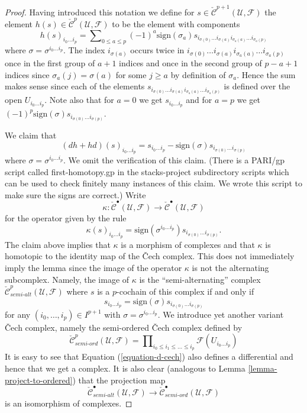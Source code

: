 \begin{proof}
\medskip\noindent
Having introduced this notation we define for
$s \in \check{\mathcal{C}}^{p + 1}(\mathcal{U}, \mathcal{F})$
the element $h(s) \in \check{\mathcal{C}}^p(\mathcal{U}, \mathcal{F})$
to be the element with components
\begin{equation}
\label{equation-first-homotopy}
h(s)_{i_0\ldots i_p} =
\sum\nolimits_{0 \leq a \leq p}
(-1)^a \text{sign}(\sigma_a)
s_{i_{\sigma(0)} \ldots i_{\sigma(a)} i_{\sigma_a(a)} \ldots i_{\sigma_a(p)}}
\end{equation}
where $\sigma = \sigma^{i_0 \ldots i_p}$. The index
$i_{\sigma(a)}$ occurs twice in
$i_{\sigma(0)} \ldots i_{\sigma(a)} i_{\sigma_a(a)} \ldots i_{\sigma_a(p)}$
once in the first group of $a + 1$ indices and once in the second group
of $p - a + 1$ indices since $\sigma_a(j) = \sigma(a)$ for some
$j \geq a$ by definition of $\sigma_a$. Hence the sum makes sense since each
of the elements
$s_{i_{\sigma(0)} \ldots i_{\sigma(a)} i_{\sigma_a(a)} \ldots i_{\sigma_a(p)}}$
is defined over the open $U_{i_0 \ldots i_p}$.
Note also that for $a = 0$ we get $s_{i_0 \ldots i_p}$ and
for $a = p$ we get
$(-1)^p \text{sign}(\sigma) s_{i_{\sigma(0)} \ldots i_{\sigma(p)}}$.

\medskip\noindent
We claim that
$$
(dh + hd)(s)_{i_0 \ldots i_p} =
s_{i_0 \ldots i_p} -
\text{sign}(\sigma) s_{i_{\sigma(0)} \ldots i_{\sigma(p)}}
$$
where $\sigma = \sigma^{i_0 \ldots i_p}$. We omit the verification
of this claim. (There is a PARI/gp script called first-homotopy.gp
in the stacks-project subdirectory scripts which can be used to check
finitely many instances of this claim.
We wrote this script to make sure the signs are correct.)
Write
$$
\kappa :
\check{\mathcal{C}}^\bullet(\mathcal{U}, \mathcal{F})
\longrightarrow
\check{\mathcal{C}}^\bullet(\mathcal{U}, \mathcal{F})
$$
for the operator given by the rule
$$
\kappa(s)_{i_0 \ldots i_p} =
\text{sign}(\sigma^{i_0 \ldots i_p}) s_{i_{\sigma(0)} \ldots i_{\sigma(p)}}.
$$
The claim above implies that $\kappa$ is a morphism of complexes and that
$\kappa$ is homotopic to the identity map of the {\v C}ech complex.
This does not immediately imply the lemma since
the image of the operator $\kappa$ is not the alternating subcomplex.
Namely, the image of $\kappa$ is the ``semi-alternating'' complex
$\check{\mathcal{C}}_{semi\text{-}alt}^p(\mathcal{U}, \mathcal{F})$
where $s$ is a $p$-cochain of this complex if and only if
$$
s_{i_0 \ldots i_p} = \text{sign}(\sigma) s_{i_{\sigma(0)} \ldots i_{\sigma(p)}}
$$
for any $(i_0, \ldots, i_p) \in I^{p + 1}$ with
$\sigma = \sigma^{i_0 \ldots i_p}$.
We introduce yet another variant {\v C}ech complex, namely the semi-ordered
{\v C}ech complex defined by
$$
\check{\mathcal{C}}_{semi\text{-}ord}^p(\mathcal{U}, \mathcal{F})
=
\prod\nolimits_{i_0 \leq i_1 \leq \ldots \leq i_p}
\mathcal{F}(U_{i_0 \ldots i_p})
$$
It is easy to see that Equation (\ref{equation-d-cech}) also defines
a differential and hence that we get a complex. It is also clear
(analogous to Lemma \ref{lemma-project-to-ordered}) that the projection map
$$
\check{\mathcal{C}}_{semi\text{-}alt}^\bullet(\mathcal{U}, \mathcal{F})
\longrightarrow
\check{\mathcal{C}}_{semi\text{-}ord}^\bullet(\mathcal{U}, \mathcal{F})
$$
is an isomorphism of complexes.


\end{proof}
